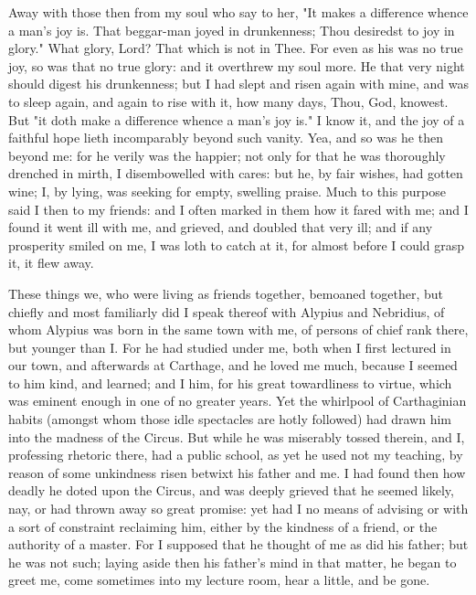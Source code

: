 \documentclass[b5paper,openright,12pt,twoside]{book}
\begin{document}
Away with those then from my soul who say to her, "It makes a difference
whence a man's joy is. That beggar-man joyed in drunkenness; Thou
desiredst to joy in glory." What glory, Lord? That which is not in
Thee. For even as his was no true joy, so was that no true glory: and
it overthrew my soul more. He that very night should digest his
drunkenness; but I had slept and risen again with mine, and was to sleep
again, and again to rise with it, how many days, Thou, God, knowest. But
"it doth make a difference whence a man's joy is." I know it, and the
joy of a faithful hope lieth incomparably beyond such vanity. Yea, and
so was he then beyond me: for he verily was the happier; not only for
that he was thoroughly drenched in mirth, I disembowelled with cares:
but he, by fair wishes, had gotten wine; I, by lying, was seeking for
empty, swelling praise. Much to this purpose said I then to my friends:
and I often marked in them how it fared with me; and I found it went ill
with me, and grieved, and doubled that very ill; and if any prosperity
smiled on me, I was loth to catch at it, for almost before I could grasp
it, it flew away.

These things we, who were living as friends together, bemoaned together,
but chiefly and most familiarly did I speak thereof with Alypius and
Nebridius, of whom Alypius was born in the same town with me, of persons
of chief rank there, but younger than I. For he had studied under me,
both when I first lectured in our town, and afterwards at Carthage, and
he loved me much, because I seemed to him kind, and learned; and I him,
for his great towardliness to virtue, which was eminent enough in one of
no greater years. Yet the whirlpool of Carthaginian habits (amongst whom
those idle spectacles are hotly followed) had drawn him into the
madness of the Circus. But while he was miserably tossed therein, and
I, professing rhetoric there, had a public school, as yet he used not my
teaching, by reason of some unkindness risen betwixt his father and me.
I had found then how deadly he doted upon the Circus, and was deeply
grieved that he seemed likely, nay, or had thrown away so great promise:
yet had I no means of advising or with a sort of constraint reclaiming
him, either by the kindness of a friend, or the authority of a master.
For I supposed that he thought of me as did his father; but he was not
such; laying aside then his father's mind in that matter, he began to
greet me, come sometimes into my lecture room, hear a little, and be
gone.
\end{document}
